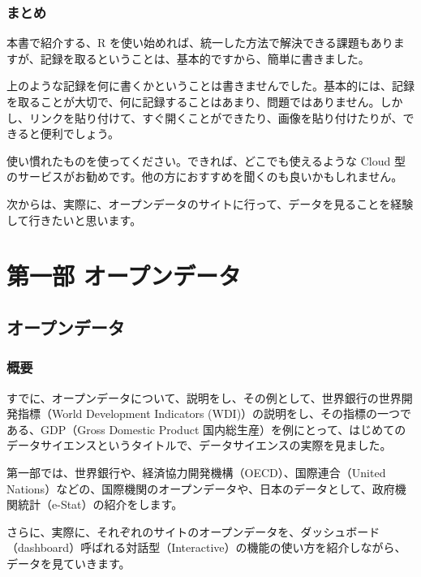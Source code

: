 \documentclass[
  xelatex, ja=standard]{bxjsbook}
\theoremstyle{definition}
\theoremstyle{definition}
\theoremstyle{definition}
\theoremstyle{definition}
\theoremstyle{remark}
\begin{document}
\hypertarget{ux307eux3068ux3081-1}{%
\section{まとめ}\label{ux307eux3068ux3081-1}}

本書で紹介する、R を使い始めれば、統一した方法で解決できる課題もありますが、記録を取るということは、基本的ですから、簡単に書きました。

上のような記録を何に書くかということは書きませんでした。基本的には、記録を取ることが大切で、何に記録することはあまり、問題ではありません。しかし、リンクを貼り付けて、すぐ開くことができたり、画像を貼り付けたりが、できると便利でしょう。

使い慣れたものを使ってください。できれば、どこでも使えるような Cloud 型のサービスがお勧めです。他の方におすすめを聞くのも良いかもしれません。

次からは、実際に、オープンデータのサイトに行って、データを見ることを経験して行きたいと思います。

\hypertarget{part-ux7b2cux4e00ux90e8-ux30aaux30fcux30d7ux30f3ux30c7ux30fcux30bf}{%
\part{第一部 オープンデータ}\label{part-ux7b2cux4e00ux90e8-ux30aaux30fcux30d7ux30f3ux30c7ux30fcux30bf}}

\hypertarget{publicdata-site}{%
\chapter{オープンデータ}\label{publicdata-site}}

\hypertarget{ux6982ux8981-1}{%
\section{概要}\label{ux6982ux8981-1}}

すでに、オープンデータについて、説明をし、その例として、世界銀行の世界開発指標（World Development Indicators (WDI)）の説明をし、その指標の一つである、GDP（Gross Domestic Product 国内総生産）を例にとって、はじめてのデータサイエンスというタイトルで、データサイエンスの実際を見ました。

第一部では、世界銀行や、経済協力開発機構（OECD）、国際連合（United Nations）などの、国際機関のオープンデータや、日本のデータとして、政府機関統計（e-Stat）の紹介をします。

さらに、実際に、それぞれのサイトのオープンデータを、ダッシュボード（dashboard）呼ばれる対話型（Interactive）の機能の使い方を紹介しながら、データを見ていきます。
\end{document}
